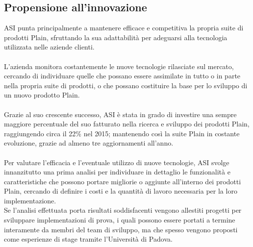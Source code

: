 \subsection{Propensione all'innovazione}
ASI punta principalmente a mantenere efficace e competitiva la propria suite di prodotti Plain, sfruttando la sua adattabilità per adeguarsi alla tecnologia utilizzata nelle aziende clienti.
\\\\
L'azienda monitora costantemente le nuove tecnologie rilasciate sul mercato, cercando di individuare quelle che possano essere assimilate in tutto o in parte nella propria suite di prodotti, o che possano costituire la base per lo sviluppo di un nuovo prodotto Plain.
\\\\
Grazie al suo crescente successo, ASI è stata in grado di investire una sempre maggiore percentuale del suo fatturato nella ricerca e sviluppo dei prodotti Plain, raggiungendo circa il 22\% nel 2015; mantenendo così la suite Plain in costante evoluzione, grazie ad almeno tre aggiornamenti all'anno.
\\\\
Per valutare l'efficacia e l'eventuale utilizzo di nuove tecnologie, ASI svolge innanzitutto una prima analisi per individuare in dettaglio le funzionalità e caratteristiche che possono portare migliorie o aggiunte all'interno dei prodotti Plain, cercando di definire i costi e la quantità di lavoro necessaria per la loro implementazione.
\\
Se l'analisi effettuata porta risultati soddisfacenti vengono allestiti progetti per sviluppare implementazioni di prova, i quali possono essere portati a termine interamente da membri del team di sviluppo, ma che spesso vengono proposti come esperienze di stage tramite l'Università di Padova.

